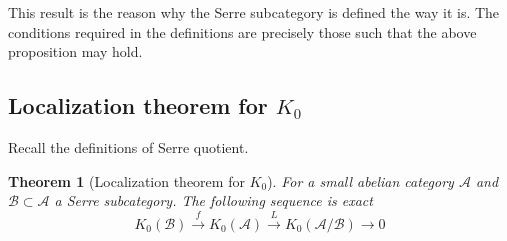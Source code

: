 \documentclass[12pt]{article}
\numberwithin{equation}{section}
\newcounter{dummy} \numberwithin{dummy}{section}
\newtheorem{theorem}[dummy]{Theorem}
\begin{document}
	This result is the reason why the Serre subcategory is defined the way it is. The conditions required in the definitions are precisely those such that the above proposition may hold.
	
	
	
	
	\subsection{Localization theorem for $K_0$}\label{Localizationk0}
	Recall the definitions of Serre quotient.
	\begin{theorem}[Localization theorem for $K_0$]
		 For a small abelian category $\mathcal{A}$ and $\mathcal{B} \subset \mathcal{A}$ a Serre subcategory. The following sequence is exact
		 \[ K_0(\mathcal{B}) \xrightarrow{f} K_0(\mathcal{A}) \xrightarrow{L} K_0(\mathcal{A/B}) \to 0 \]
	\end{theorem}
\end{document}
